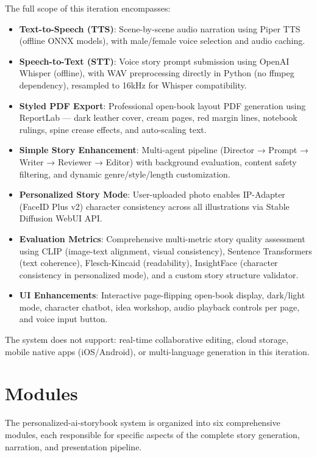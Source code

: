 The full scope of this iteration encompasses:
\begin{itemize}
    \item \textbf{Text-to-Speech (TTS)}: Scene-by-scene audio narration using Piper TTS (offline ONNX models), with male/female voice selection and audio caching.
    \item \textbf{Speech-to-Text (STT)}: Voice story prompt submission using OpenAI Whisper (offline), with WAV preprocessing directly in Python (no ffmpeg dependency), resampled to 16kHz for Whisper compatibility.
    \item \textbf{Styled PDF Export}: Professional open-book layout PDF generation using ReportLab — dark leather cover, cream pages, red margin lines, notebook rulings, spine crease effects, and auto-scaling text.
    \item \textbf{Simple Story Enhancement}: Multi-agent pipeline (Director → Prompt → Writer → Reviewer → Editor) with background evaluation, content safety filtering, and dynamic genre/style/length customization.
    \item \textbf{Personalized Story Mode}: User-uploaded photo enables IP-Adapter (FaceID Plus v2) character consistency across all illustrations via Stable Diffusion WebUI API.
    \item \textbf{Evaluation Metrics}: Comprehensive multi-metric story quality assessment using CLIP (image-text alignment, visual consistency), Sentence Transformers (text coherence), Flesch-Kincaid (readability), InsightFace (character consistency in personalized mode), and a custom story structure validator.
    \item \textbf{UI Enhancements}: Interactive page-flipping open-book display, dark/light mode, character chatbot, idea workshop, audio playback controls per page, and voice input button.
\end{itemize}

The system does not support: real-time collaborative editing, cloud storage, mobile native apps (iOS/Android), or multi-language generation in this iteration.


\section{Modules}

The personalized-ai-storybook system is organized into six comprehensive modules, each responsible for specific aspects of the complete story generation, narration, and presentation pipeline.

